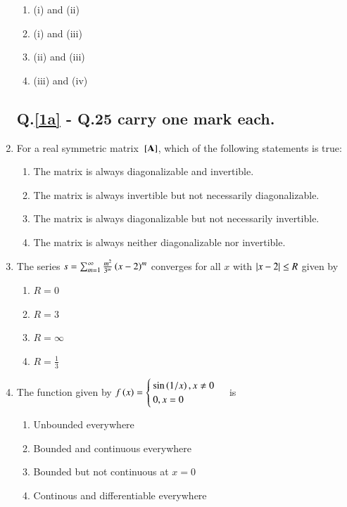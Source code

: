 \documentclass[journal]{IEEEtran}
\begin{document}
\begin{enumerate}
        \begin{enumerate}
            \item (i) and (ii)
            \item (i) and (iii)
            \item (ii) and (iii)
            \item (iii) and (iv)
        \end{enumerate} 

    \subsection*{Q.\ref{1a} - Q.25 carry one mark each.}
        \item \label{1a} For a real symmetric matrix ${}\left[\mathbf{A}\right]$, which of the following statements is true:
            \begin{enumerate}
                \item The matrix is always diagonalizable and invertible.
                \item The matrix is always invertible but not necessarily diagonalizable.
                \item The matrix is always diagonalizable but not necessarily invertible.
                \item The matrix is always neither diagonalizable nor invertible.
            \end{enumerate}

        \item The series $s = \sum_{m=1}^{\infty} \frac{m^2}{3^m} \left(x-2\right)^m$ converges for all $x$ with $\left\vert x-2\right\vert \leq R$ given by 
            \begin{enumerate}
                \item $R=0$
                \item $R=3$
                \item $R=\infty$
                \item $R=\frac{1}{3}$
            \end{enumerate}

        \item The function given by $f\left(x\right) = \begin{cases}  \sin \left(1/x\right), x \neq 0 \\ 0, x=0 \end{cases}$ is
            \begin{enumerate}
                \item Unbounded everywhere
                \item Bounded and continuous everywhere
                \item Bounded but not continuous at $x=0$
                \item Continous and differentiable everywhere
            \end{enumerate}
    \end{enumerate}

  
\end{document}
